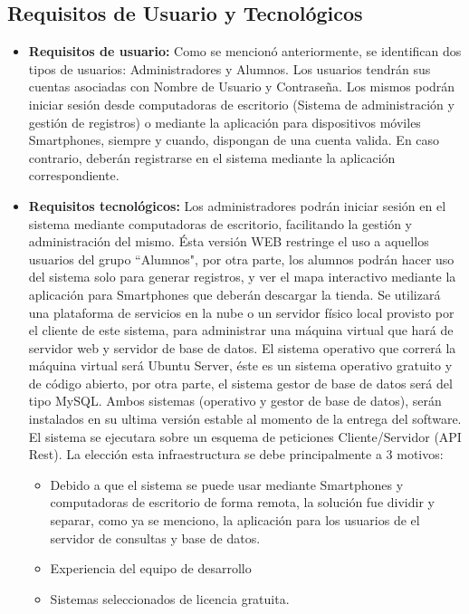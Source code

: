     \subsection{Requisitos de Usuario y Tecnológicos}
      \begin{itemize}
        \item \textbf{Requisitos de usuario:} Como se mencionó anteriormente, se identifican dos tipos de usuarios: Administradores y Alumnos. Los usuarios tendrán sus cuentas asociadas con Nombre de Usuario y Contraseña. Los mismos podrán iniciar sesión desde computadoras de escritorio (Sistema de administración y gestión de registros) o mediante la aplicación para dispositivos móviles Smartphones, siempre y cuando, dispongan de una cuenta valida. En caso contrario, deberán registrarse en el sistema mediante la aplicación correspondiente.

        \item \textbf{Requisitos tecnológicos:} Los administradores podrán iniciar sesión en el sistema mediante computadoras de escritorio, facilitando la gestión y administración del mismo. Ésta versión WEB restringe el uso a aquellos usuarios del grupo ``Alumnos", por otra parte, los alumnos podrán hacer uso del sistema solo para generar registros, y ver el mapa interactivo mediante la aplicación para Smartphones que deberán descargar la tienda.
        Se utilizará una plataforma de servicios en la nube o un servidor físico local provisto por el cliente de este sistema, para administrar una máquina virtual que hará de servidor web y servidor de base de datos. El sistema operativo que correrá la máquina virtual será Ubuntu Server, éste es un sistema operativo gratuito y de código abierto, por otra parte, el sistema gestor de base de datos será del tipo MySQL. Ambos sistemas (operativo y gestor de base de datos), serán instalados en su ultima versión estable al momento de la entrega del software.
        El sistema se ejecutara sobre un esquema de peticiones Cliente/Servidor (API Rest). La elección esta infraestructura se debe principalmente a 3 motivos: 
        \begin{itemize}
          \item Debido a que el sistema se puede usar mediante Smartphones y computadoras de escritorio de forma remota, la solución fue dividir y separar, como ya se menciono, la aplicación para los usuarios de el servidor de consultas y base de datos.
          \item Experiencia del equipo de desarrollo 
          \item Sistemas seleccionados de licencia gratuita.
        \end{itemize}
      \end{itemize}

